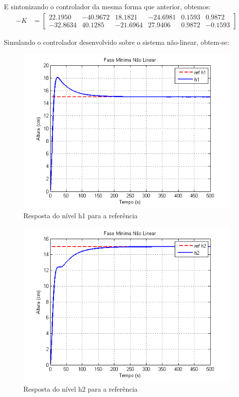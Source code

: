 \documentclass[11pt,]{article}
\begin{document}
	E sintonizando o controlador da mesma forma que anterior, obtemos:
	\begin{align*}
	-K &= 
	\begin{bmatrix}
	22.1950 & -40.9672 & 18.1821 & -24.6981 & 0.1593 & 0.9872\\
	-32.8634 & 40.1285 & -21.6964 & 27.9406  & 0.9872 & -0.1593
	\end{bmatrix}
	\end{align*}
	
	Simulando o controlador desenvolvido sobre o sistema não-linear, obtem-se:
	\begin{figure}[H]
		\centering
		\includegraphics[scale=1]{h1_lin10_nm.png}
		\caption{Resposta do nível h1 para a referência}
		\label{H1_lin10_nm}
	\end{figure}
	\begin{figure}[H]
		\centering
		\includegraphics[scale=1]{h2_lin10_nm.png}
		\caption{Resposta do nível h2 para a referência}
		\label{H2_lin10_nm}
	\end{figure}
	
\end{document}
